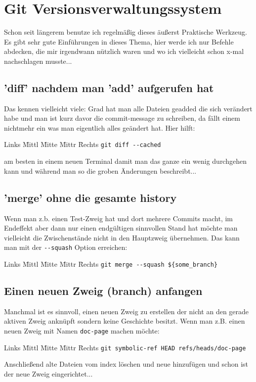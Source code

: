 \documentclass[12pt]{article}
\newenvironment{code}{\begin{tabbing}Links \= Mittl \= Mitte \= Mittr \= Rechts \kill}{\end{tabbing}}
\begin{document}
\section{Git Versionsverwaltungssystem}
Schon seit längerem benutze ich regelmäßig dieses äußerst Praktische Werkzeug.
Es gibt sehr gute Einführungen in dieses Thema, hier werde ich nur Befehle abdecken, die 
mir irgendwann nützlich waren und wo ich vielleicht schon x-mal nachschlagen musste...

\subsection{'diff' nachdem man 'add' aufgerufen hat}
Das kennen vielleicht viele: Grad hat man alle Dateien geadded die sich verändert habe und man
ist kurz davor die commit-message zu schreiben, da fällt einem nichtmehr ein was man eigentlich alles
geändert hat. Hier hilft:
\begin{code}
	\> \verb#git diff --cached#
\end{code}
am besten in einem neuen Terminal damit man das ganze ein wenig durchgehen kann und während man so
die groben Änderungen beschreibt...

\subsection{'merge' ohne die gesamte history}
Wenn man z.b. einen Test-Zweig hat und dort mehrere Commits macht, im Endeffekt aber 
dann nur einen endgültigen sinnvollen Stand hat möchte man vielleicht die Zwischenstände
nicht in den Hauptzweig übernehmen. Das kann man mit der \verb#--squash#
Option erreichen:
\begin{code}
	\> \verb#git merge --squash ${some_branch}#
\end{code}

\subsection{Einen neuen Zweig (branch) anfangen}
Manchmal ist es sinnvoll, einen neuen Zweig zu erstellen der nicht an den gerade aktiven Zweig anknüpft sondern keine Geschichte besitzt. Wenn man z.B. einen neuen Zweig mit Namen \verb#doc-page# machen möchte:
\begin{code}
	\> \verb#git symbolic-ref HEAD refs/heads/doc-page#
\end{code}
Anschließend alte Dateien vom index löschen und neue hinzufügen und schon ist der neue Zweig eingerichtet...
\end{document}

